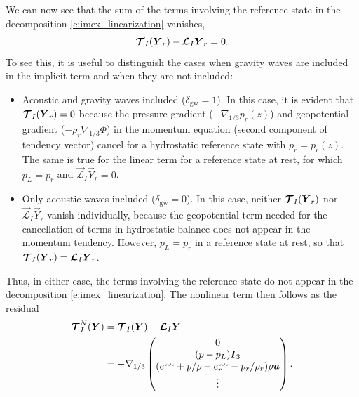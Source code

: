 \documentclass{report}
\begin{document}
We can now see that the sum of the terms involving the reference state in the decomposition \eqref{e:imex_linearization} vanishes,
\[
\boldsymbol{{\mathcal{T}}}_I(\boldsymbol{{Y}}_r) - \boldsymbol{{\mathcal{L}}}_I \boldsymbol{{Y}}_r = 0.
\]
To see this, it is useful to distinguish the cases when gravity waves are included in the implicit term and when they are not included: 
\begin{itemize}
    \item Acoustic and gravity waves included ($\delta_{\mathrm{gw}}=1$). In this case, it is evident that $\boldsymbol{{\mathcal{T}}}_I(\boldsymbol{{Y}}_r)=0$ because the pressure gradient ($-\nabla_{1/3} p_r(z)$) and geopotential gradient ($-\rho_r\nabla_{1/3}\Phi$) in the momentum equation (second component of tendency vector) cancel for a hydrostatic reference state with $p_r = p_r(z)$. The same is true for the linear term for a reference state at rest, for which $p_L = p_r$ and $\vec{\mathcal{L}}_I \vec{Y}_r = 0$. 
    \item Only acoustic waves included ($\delta_{\mathrm{gw}}=0$). In this case, neither $\boldsymbol{{\mathcal{T}}}_I(\boldsymbol{{Y}}_r)$ nor $\vec{\mathcal{L}}_I\vec{Y}_r$ vanish individually, because the geopotential term needed for the cancellation of terms in hydrostatic balance does not appear in the momentum tendency. However, $p_L = p_r$ in a reference state at rest, so that $\boldsymbol{{\mathcal{T}}}_I(\boldsymbol{{Y}}_r) = \boldsymbol{{\mathcal{L}}}_I\boldsymbol{{Y}}_r$.
\end{itemize}
Thus, in either case, the terms involving the reference state do not appear  in the decomposition \eqref{e:imex_linearization}. The nonlinear term then follows as the residual 
\begin{equation}\label{e:nonlinear_residual}
\begin{split}
\boldsymbol{{\mathcal{T}}}^N_{I}(\boldsymbol{{Y}}) & =  \boldsymbol{{\mathcal{T}}}_I(\boldsymbol{{Y}}) - \boldsymbol{{\mathcal{L}}}_I \boldsymbol{{Y}} \\
& = 
-\nabla_{1/3} \begin{pmatrix}
0 \\
(p - p_L) \boldsymbol{{I}}_3\\
(e^{\mathrm{tot}}  + p/\rho - e^{\mathrm{tot}}_r - p_r/\rho_r) \rho \boldsymbol{{u}}\\
\vdots
\end{pmatrix}.
\end{split}
\end{equation}
\end{document}
